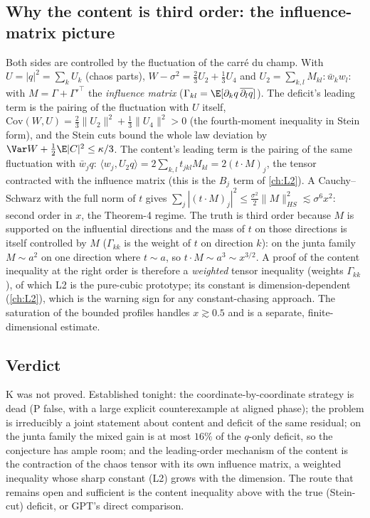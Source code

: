 \subsection{Why the content is third order: the influence-matrix picture}
Both sides are controlled by the fluctuation of the carré du champ. With $U=|q|^2=\sum_kU_k$ (chaos parts), $W-\sigma^2=\frac23U_2+\frac13U_4$ and $U_2=\sum_{k,l}M_{kl}{:}\bar w_kw_l{:}$
with $M=\Gamma+\Gamma'^{\top}$ the \emph{influence matrix} ($\Gamma_{kl}=\E[\partial_kq\,\overline{\partial_lq}]$). The deficit's leading term is the pairing of the fluctuation with $U$
itself, $\mathrm{Cov}(W,U)=\frac23\|U_2\|^2+\frac13\|U_4\|^2>0$ (the fourth-moment inequality in Stein form), and the Stein cuts bound the whole law deviation by
$\Var W+\frac12\E|C|^2\le\kappa/3$. The content's leading term is the pairing of the same fluctuation with $\bar w_jq$: $\langle w_j,U_2q\rangle=2\sum_{k,l}t_{jkl}M_{kl}=2(t\cdot M)_j$,
the tensor contracted with the influence matrix (this is the $B_j$ term of \autoref{ch:L2}). A Cauchy--Schwarz with the full norm of $t$ gives $\sum_j|(t\cdot M)_j|^2\le\frac{\sigma^2}2\|M\|_{HS}^2
\lesssim\sigma^6x^2$: second order in $x$, the Theorem-4 regime. The truth is third order because $M$ is supported on the influential directions and the mass of $t$ on those directions is
itself controlled by $M$ ($\Gamma_{kk}$ is the weight of $t$ on direction $k$): on the junta family $M\sim a^2$ on one direction where $t\sim a$, so $t\cdot M\sim a^3\sim x^{3/2}$. A proof of
the content inequality at the right order is therefore a \emph{weighted} tensor inequality (weights $\Gamma_{kk}$), of which L2 is the pure-cubic prototype; its constant is
dimension-dependent (\autoref{ch:L2}), which is the warning sign for any constant-chasing approach. The saturation of the bounded profiles handles $x\gtrsim0.5$ and is a separate,
finite-dimensional estimate.

\subsection{Verdict}
K was not proved. Established tonight: the coordinate-by-coordinate strategy is dead (P false, with a large explicit counterexample at aligned phase); the problem is
irreducibly a joint statement about content and deficit of the same residual; on the junta family the mixed gain is at most $16\%$ of the $q$-only deficit, so the conjecture has
ample room; and the leading-order mechanism of the content is the contraction of the chaos tensor with its own influence matrix, a weighted inequality whose sharp constant
(L2) grows with the dimension. The route that remains open and sufficient is the content inequality above with the true (Stein-cut) deficit, or GPT's direct comparison.


